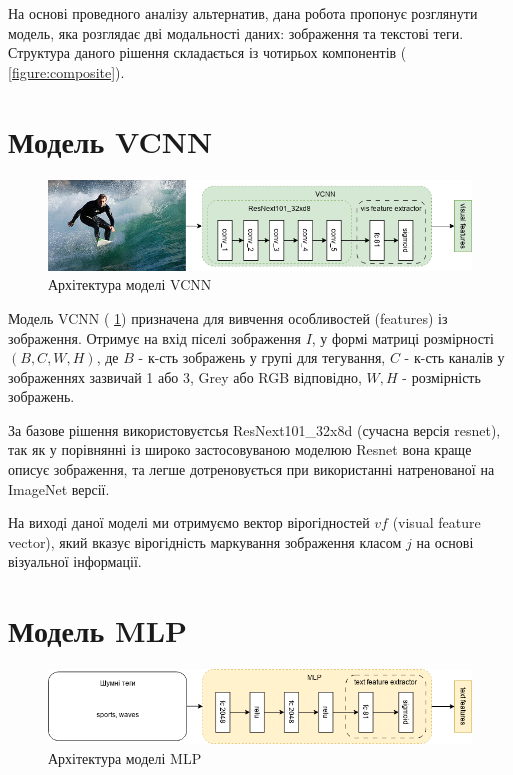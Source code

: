 \documentclass{udstu}
\begin{document}
На основі проведного аналізу альтернатив, дана робота пропонує розглянути
модель, яка розглядає дві модальності даних: зображення та текстові теги.
Структура даного рішення складається із чотирьох компонентів (\figurename{ \ref{figure:composite}}).


\section{Модель VCNN}

\begin{figure}[!ht]
	\centering
	\includegraphics[width=1.0\textwidth]{PNG/vcnn}
	\caption{Архітектура моделі VCNN}
	\label{figure:vcnn}
\end{figure}

Модель VCNN (\figurename{ \ref{figure:vcnn}}) призначена для вивчення особливостей (features) із зображення.
Отримує на вхід піселі зображення $I$, у формі матриці розмірності $(B,C,W,H)$, де
$B$ - к-сть зображень у групі для тегування,
$C$ - к-сть каналів у зображеннях зазвичай 1 або 3, Grey або RGB відповідно,
$W,H$ - розмірність зображень.

За базове рішення використовуєтсья ResNext101\_32x8d \cite{resnext} (сучасна версія resnet),
так як у порівнянні із широко застосовуваною моделюю Resnet \cite{resnet} вона краще описує
зображення, та легше дотреновується при використанні натренованої на ImageNet \cite{deng2009imagenet} версії.

На виході даної моделі ми отримуємо вектор вірогідностей $vf$ (visual feature vector),
який вказує вірогідність маркування зображення класом $j$ на основі візуальної інформації.


\section{Модель MLP}

\begin{figure}[!ht]
	\centering
	\includegraphics[width=1.0\textwidth]{PNG/mlp}
	\caption{Архітектура моделі MLP}
	\label{figure:mlp}
\end{figure}
\end{document}
